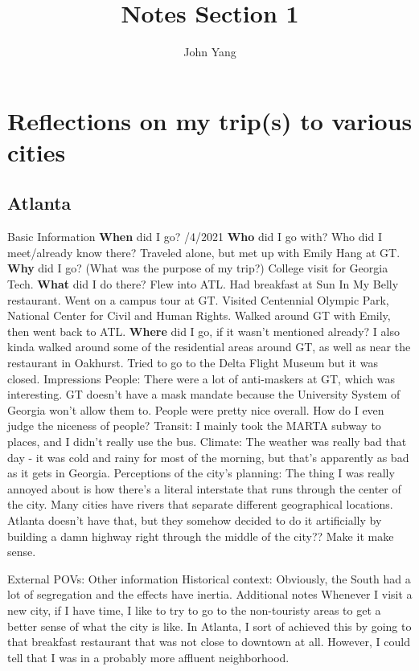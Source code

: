 \documentclass{article}
\title{Notes Section 1} %
\author{John Yang}
\begin{document}
    \maketitle
    \tableofcontents
    \section{Reflections on my trip(s) to various cities}
    \subsection{Atlanta}
    \begin{outline}
        \1 Basic Information
            \2 \textbf{When} did I go?
                /4/2021
            \2 \textbf{Who} did I go with? Who did I meet/already know there?
                \3 Traveled alone, but met up with Emily Hang at GT. 
            \2 \textbf{Why} did I go? (What was the purpose of my trip?)
                \3 College visit for Georgia Tech. 
            \2 \textbf{What} did I do there?
                \3 Flew into ATL. Had breakfast at Sun In My Belly restaurant. Went on a campus tour at GT. Visited Centennial Olympic Park, National Center for Civil and Human Rights. Walked around GT with Emily, then went back to ATL. 
            \2 \textbf{Where} did I go, if it wasn't mentioned already?
                \3 I also kinda walked around some of the residential areas around GT, as well as near the restaurant in Oakhurst. 
                \3 Tried to go to the Delta Flight Museum but it was closed. 
        \1 Impressions
            \2 People: 
                \3 There were a lot of anti-maskers at GT, which was interesting. GT doesn't have a mask mandate because the University System of Georgia won't allow them to. 
                \3 People were pretty nice overall. How do I even judge the niceness of people?
            \2 Transit:
                \3 I mainly took the MARTA subway to places, and I didn't really use the bus. 
            \2 Climate:
                \3 The weather was really bad that day - it was cold and rainy for most of the morning, but that's apparently as bad as it gets in Georgia. 
            \2 Perceptions of the city's planning:
                \3 The thing I was really annoyed about is how there's a literal interstate that runs through the center of the city. Many cities have rivers that separate different geographical locations. Atlanta doesn't have that, but they somehow decided to do it artificially by building a damn highway right through the middle of the city?? Make it make sense. 

            \2 External POVs:
        \1 Other information 
            \2 Historical context:
                \3 Obviously, the South had a lot of segregation and the effects have inertia. 
            \2 Additional notes 
                \3 Whenever I visit a new city, if I have time, I like to try to go to the non-touristy areas to get a better sense of what the city is like. In Atlanta, I sort of achieved this by going to that breakfast restaurant that was not close to downtown at all. However, I could tell that I was in a probably more affluent neighborhood. 
    \end{outline}
\end{document}
